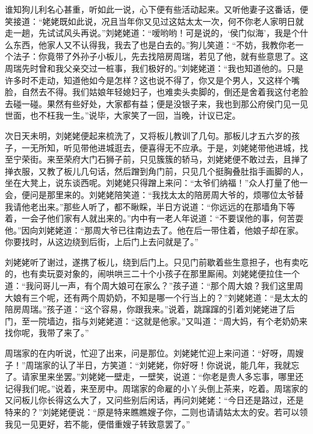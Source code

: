 \documentclass[12pt,oneside]{book}
\begin{document}
谁知狗儿利名心甚重，听如此一说，心下便有些活动起来。又听他妻子这番话，便笑接道：“姥姥既如此说，况且当年你又见过这姑太太一次，何不你老人家明日就走一趟，先试试风头再说。”刘姥姥道：“嗳哟哟！可是说的，‘侯门似海’，我是个什么东西，他家人又不认得我，我去了也是白去的。”狗儿笑道：“不妨，我教你老一个法子：你竟带了外孙子小板儿，先去找陪房周瑞，若见了他，就有些意思了。这周瑞先时曾和我父亲交过一桩事，我们极好的。”刘姥姥道：“我也知道他的。只是许多时不走动，知道他如今是怎样？这也说不得了，你又是个男人，又这样个嘴脸，自然去不得。我们姑娘年轻媳妇子，也难卖头卖脚的，倒还是舍着我这付老脸去碰一碰。果然有些好处，大家都有益；便是没银子来，我也到那公府侯门见一见世面，也不枉我一生。”说毕，大家笑了一回，当晚，计议已定。

次日天未明，刘姥姥便起来梳洗了，又将板儿教训了几句。那板儿才五六岁的孩子，一无所知，听见带他进城逛去，便喜得无不应承。于是，刘姥姥带他进城，找至宁荣街。来至荣府大门石狮子前，只见簇簇的轿马，刘姥姥便不敢过去，且掸了掸衣服，又教了板儿几句话，然后蹭到角门前，只见几个挺胸叠肚指手画脚的人，坐在大凳上，说东谈西呢。刘姥姥只得蹭上来问：“太爷们纳福！”众人打量了他一会，便问是那里来的。刘姥姥陪笑道：“我找太太的陪房周大爷的，烦哪位太爷替我请他老出来。”那些人听了，都不瞅睬，半日方说道：“你远远的在那墙角下等着，一会子他们家有人就出来的。”内中有一老人年说道：“不要误他的事，何苦耍他。”因向刘姥姥道：“那周大爷已往南边去了。他在后一带住着，他娘子却在家。你要找时，从这边绕到后街，上后门上去问就是了。”

刘姥姥听了谢过，遂携了板儿，绕到后门上。只见门前歇着些生意担子，也有卖吃的，也有卖玩耍对象的，闹哄哄三二十个小孩子在那里厮闹。刘姥姥便拉住一个道：“我问哥儿一声，有个周大娘可在家么？”孩子道：“那个周大娘？我们这里周大娘有三个呢，还有两个周奶奶，不知是哪一个行当上的？”刘姥姥道：“是太太的陪房周瑞。”孩子道：“这个容易，你跟我来。”说着，跳蹿蹿的引着刘姥姥进了后门，至一院墙边，指与刘姥姥道：“这就是他家。”又叫道：“周大妈，有个老奶奶来找你呢，我带了来了。”

周瑞家的在内听说，忙迎了出来，问是那位。刘姥姥忙迎上来问道：“好呀，周嫂子！”周瑞家的认了半日，方笑道：“刘姥姥，你好呀！你说说，能几年，我就忘了。请家里来坐罢。”刘姥姥一壁走，一壁笑，说道：“你老是贵人多忘事，哪里还记得我们呢。”说着，来至房中。周瑞家的命雇的小丫头倒上茶来，吃着。周瑞家的又问板儿你长得这么大了，又问些别后闲话，再问刘姥姥：“今日还是路过，还是特来的？”刘姥姥便说：“原是特来瞧瞧嫂子你，二则也请请姑太太的安。若可以领我见一见更好，若不能，便借重嫂子转致意罢了。”
\end{document}

